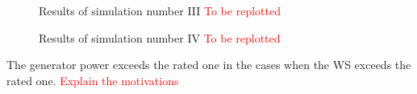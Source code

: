 \begin{figure}[htb]
  \centering
  \caption{Results of simulation number III \textcolor{red}{To be replotted}}
  \label{fig:simulation_3}
\end{figure}

\begin{figure}[htb]
  \centering
  \caption{Results of simulation number IV \textcolor{red}{To be replotted}}
  \label{fig:simulation_4}
\end{figure}

The generator power exceeds the rated one in the cases when the \acrshort{WS} exceeds the rated one. \textcolor{red}{Explain the motivations}\\


